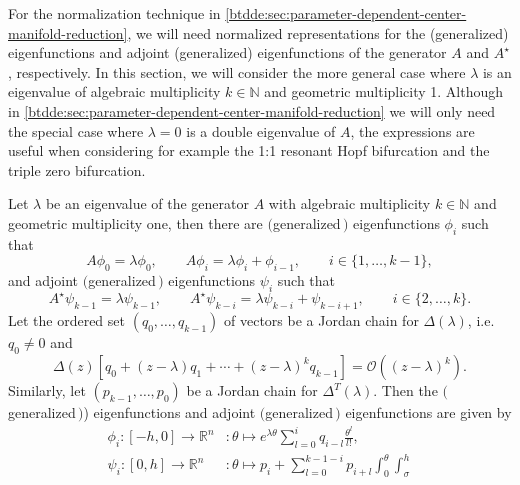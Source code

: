 For the normalization technique in \cref{btdde:sec:parameter-dependent-center-manifold-reduction},
we will need normalized representations for the (generalized) eigenfunctions and adjoint
(generalized) eigenfunctions of the generator $A$ and $A^\star$, respectively.
In this section, we will consider the more general case where $\lambda$ is an eigenvalue of
algebraic multiplicity $k \in \mathbb N$ and geometric multiplicity 1.  
Although in \cref{btdde:sec:parameter-dependent-center-manifold-reduction} we will
only need the special case where $\lambda=0$ is a double eigenvalue of $A$, the
expressions are useful when considering for example the 1:1 resonant Hopf
bifurcation and the triple zero bifurcation.

\begin{proposition}
\label{btdde:proposition:eigenvalues_multiplicity_k}
Let $\lambda$ be an eigenvalue of the generator $A$ with algebraic multiplicity
$k\in\mathbb N$ and geometric multiplicity one, then there are $($generalized\,$)$
eigenfunctions $\phi_i$ such that
%
\begin{equation}
\label{btdde:eq:eigenspaces_eigenfunctions}
A\phi_0 = \lambda\phi_0,\qquad A\phi_i = \lambda\phi_i + \phi_{i-1}, \qquad i \in \{1,\dots,k-1\},
\end{equation}
%
and adjoint $($generalized\,$)$ eigenfunctions $\psi_i$ such
that
%
\begin{equation}
\label{btdde:eq:eigenspaces_ad_eigenfunctions}
A^{\star}\psi_{k-1} = \lambda\psi_{k-1}, \qquad 
    A^{\star}\psi_{k-i} = \lambda\psi_{k-i} + \psi_{k-i + 1}, \qquad i \in \{2,\dots,k\}.
\end{equation}
%
Let the ordered set $(q_0,\dots,q_{k-1})$ of vectors be a Jordan chain for $\Delta(\lambda)$, i.e.
$q_0 \neq 0$ and 
\[
    \Delta(z)[q_0 + (z-\lambda) q_1 + \cdots + (z-\lambda)^k q_{k-1}] = \mathcal O((z-\lambda)^k).
\]
Similarly, let $(p_{k-1},\dots,p_0)$ be a Jordan chain for $\Delta^T(\lambda)$.
Then the $($generalized\,$)$) eigenfunctions and adjoint $($generalized\,$)$ eigenfunctions are given by 
\begin{equation}
\label{btdde:eq:eigenfunction_and_adjoint_eigenfunctions}
\begin{aligned}
\phi_i \colon [-h,0] \rightarrow \mathbb R^n &\colon \theta \mapsto e^{\lambda\theta} \sum_{l=0}^i q_{i-l} \frac{\theta^l}{l!}, \\
\psi_i \colon [0,h]  \rightarrow \mathbb R^n &\colon \theta \mapsto p_i + \sum_{l=0}^{k-1-i} p_{i + l} \int_0^\theta \int_{\sigma}^h 

\end{aligned}
\end{equation}
\end{proposition}

